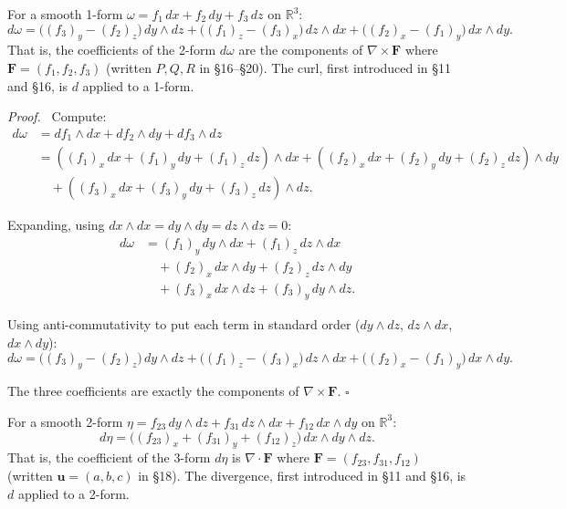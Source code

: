 \documentclass[11pt]{report}
\renewenvironment{proof}[1][Proof]{\par\noindent\textit{#1.}\ }{\hfill$\square$\par\medskip}
\newcommand{\R}{\mathbb{R}}
\begin{document}
\begin{proposition}
For a smooth 1-form $\omega = f_1 \, dx + f_2 \, dy + f_3 \, dz$ on $\R^3$:
\[
d\omega = \big((f_3)_y - (f_2)_z\big) \, dy \wedge dz + \big((f_1)_z - (f_3)_x\big) \, dz \wedge dx + \big((f_2)_x - (f_1)_y\big) \, dx \wedge dy.
\]
That is, the coefficients of the 2-form $d\omega$ are the components of $\nabla \times \mathbf{F}$ where $\mathbf{F} = (f_1, f_2, f_3)$ (written $P, Q, R$ in \S16--\S20). The curl, first introduced in \S11 and \S16, is $d$ applied to a 1-form.
\end{proposition}

\begin{proof}
Compute:
\begin{align*}
d\omega &= df_1 \wedge dx + df_2 \wedge dy + df_3 \wedge dz \\
&= ((f_1)_x \, dx + (f_1)_y \, dy + (f_1)_z \, dz) \wedge dx + ((f_2)_x \, dx + (f_2)_y \, dy + (f_2)_z \, dz) \wedge dy \\
&\quad + ((f_3)_x \, dx + (f_3)_y \, dy + (f_3)_z \, dz) \wedge dz.
\end{align*}

Expanding, using $dx \wedge dx = dy \wedge dy = dz \wedge dz = 0$:
\begin{align*}
d\omega &= (f_1)_y \, dy \wedge dx + (f_1)_z \, dz \wedge dx \\
&\quad + (f_2)_x \, dx \wedge dy + (f_2)_z \, dz \wedge dy \\
&\quad + (f_3)_x \, dx \wedge dz + (f_3)_y \, dy \wedge dz.
\end{align*}

Using anti-commutativity to put each term in standard order ($dy \wedge dz$, $dz \wedge dx$, $dx \wedge dy$):
\[
d\omega = \big((f_3)_y - (f_2)_z\big) \, dy \wedge dz + \big((f_1)_z - (f_3)_x\big) \, dz \wedge dx + \big((f_2)_x - (f_1)_y\big) \, dx \wedge dy.
\]

The three coefficients are exactly the components of $\nabla \times \mathbf{F}$.
\end{proof}

\begin{proposition}
For a smooth 2-form $\eta = f_{23} \, dy \wedge dz + f_{31} \, dz \wedge dx + f_{12} \, dx \wedge dy$ on $\R^3$:
\[
d\eta = \big((f_{23})_x + (f_{31})_y + (f_{12})_z\big) \, dx \wedge dy \wedge dz.
\]
That is, the coefficient of the 3-form $d\eta$ is $\nabla \cdot \mathbf{F}$ where $\mathbf{F} = (f_{23}, f_{31}, f_{12})$ (written $\mathbf{u} = (a, b, c)$ in \S18). The divergence, first introduced in \S11 and \S16, is $d$ applied to a 2-form.
\end{proposition}
\end{document}
